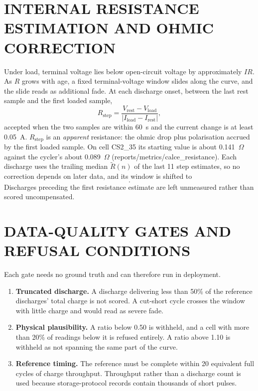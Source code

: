 \documentclass[12pt,a4paper]{amritareport}
\begin{document}
\section{INTERNAL RESISTANCE ESTIMATION AND OHMIC CORRECTION}
\label{sec:rstep}

Under load, terminal voltage lies below open-circuit voltage by approximately $IR$. As $R$ grows with age, a fixed terminal-voltage window slides along the curve, and the slide reads as additional fade. At each discharge onset, between the last rest sample and the first loaded sample,
\begin{equation}
R_\mathrm{step} = \frac{V_\mathrm{rest} - V_\mathrm{load}}{|I_\mathrm{load} - I_\mathrm{rest}|},
\label{eq:rstep}
\end{equation}
accepted when the two samples are within 60~s and the current change is at least 0.05~A. $R_\mathrm{step}$ is an \emph{apparent} resistance: the ohmic drop plus polarisation accrued by the first loaded sample. On cell CS2\_35 its starting value is about 0.141~$\Omega$ against the cycler's about 0.089~$\Omega$ (reports/metrics/calce\_resistance). Each discharge uses the trailing median $\tilde R(n)$ of the last 11 step estimates, so no correction depends on later data, and its window is shifted to
\begin{equation}
[V_\mathrm{low} - |I_n|\tilde R(n),\; V_\mathrm{high} - |I_n|\tilde R(n)] .
\label{eq:shift}
\end{equation}
Discharges preceding the first resistance estimate are left unmeasured rather than scored uncompensated.

\section{DATA-QUALITY GATES AND REFUSAL CONDITIONS}
\label{sec:gates}

Each gate needs no ground truth and can therefore run in deployment.

\begin{enumerate}
    \item \textbf{Truncated discharge.} A discharge delivering less than 50\% of the reference discharges' total charge is not scored. A cut-short cycle crosses the window with little charge and would read as severe fade.
    \item \textbf{Physical plausibility.} A ratio below 0.50 is withheld, and a cell with more than 20\% of readings below it is refused entirely. A ratio above 1.10 is withheld as not spanning the same part of the curve.
    \item \textbf{Reference timing.} The reference must be complete within 20 equivalent full cycles of charge throughput. Throughput rather than a discharge count is used because storage-protocol records contain thousands of short pulses.
\end{enumerate}
\end{document}

